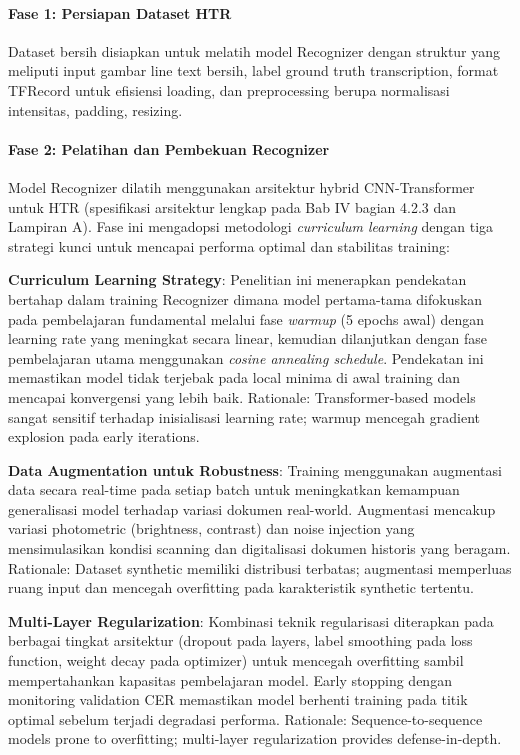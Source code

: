 \documentclass[12pt,a4paper]{article}
\begin{document}
\paragraph{Fase 1: Persiapan Dataset HTR}
Dataset bersih disiapkan untuk melatih model Recognizer dengan struktur yang meliputi input gambar line text bersih, label ground truth transcription, format TFRecord untuk efisiensi loading, dan preprocessing berupa normalisasi intensitas, padding, resizing.

\paragraph{Fase 2: Pelatihan dan Pembekuan Recognizer}
Model Recognizer dilatih menggunakan arsitektur hybrid CNN-Transformer untuk HTR (spesifikasi arsitektur lengkap pada Bab IV bagian 4.2.3 dan Lampiran A). Fase ini mengadopsi metodologi \textit{curriculum learning} dengan tiga strategi kunci untuk mencapai performa optimal dan stabilitas training:

\textbf{Curriculum Learning Strategy}: Penelitian ini menerapkan pendekatan bertahap dalam training Recognizer dimana model pertama-tama difokuskan pada pembelajaran fundamental melalui fase \textit{warmup} (5 epochs awal) dengan learning rate yang meningkat secara linear, kemudian dilanjutkan dengan fase pembelajaran utama menggunakan \textit{cosine annealing schedule}. Pendekatan ini memastikan model tidak terjebak pada local minima di awal training dan mencapai konvergensi yang lebih baik. Rationale: Transformer-based models sangat sensitif terhadap inisialisasi learning rate; warmup mencegah gradient explosion pada early iterations.

\textbf{Data Augmentation untuk Robustness}: Training menggunakan augmentasi data secara real-time pada setiap batch untuk meningkatkan kemampuan generalisasi model terhadap variasi dokumen real-world. Augmentasi mencakup variasi photometric (brightness, contrast) dan noise injection yang mensimulasikan kondisi scanning dan digitalisasi dokumen historis yang beragam. Rationale: Dataset synthetic memiliki distribusi terbatas; augmentasi memperluas ruang input dan mencegah overfitting pada karakteristik synthetic tertentu.

\textbf{Multi-Layer Regularization}: Kombinasi teknik regularisasi diterapkan pada berbagai tingkat arsitektur (dropout pada layers, label smoothing pada loss function, weight decay pada optimizer) untuk mencegah overfitting sambil mempertahankan kapasitas pembelajaran model. Early stopping dengan monitoring validation CER memastikan model berhenti training pada titik optimal sebelum terjadi degradasi performa. Rationale: Sequence-to-sequence models prone to overfitting; multi-layer regularization provides defense-in-depth.
\end{document}
